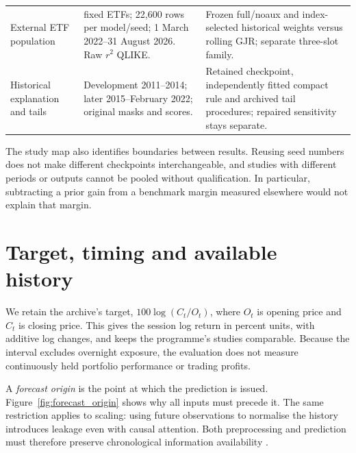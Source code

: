 \begin{longtable}{@{}>{\raggedright\arraybackslash}p{2.7cm}>{\raggedright\arraybackslash}p{5.5cm}>{\raggedright\arraybackslash}p{6.4cm}@{}}
External ETF population & 20 fixed ETFs; 22,600 rows per model/seed; 1 March 2022--31 August 2026. Raw $r^2$ QLIKE. & Frozen full/noaux and index-selected historical weights versus rolling GJR; separate three-slot family. \\
Historical explanation and tails & Development 2011--2014; later 2015--February 2022; original masks and scores. & Retained checkpoint, independently fitted compact rule and archived tail procedures; repaired sensitivity stays separate. \\
\bottomrule\end{longtable}

The study map also identifies boundaries between results. Reusing seed numbers does not make different checkpoints interchangeable, and studies with different periods or outputs cannot be pooled without qualification. In particular, subtracting a prior gain from a benchmark margin measured elsewhere would not explain that margin.

\section{Target, timing and available history}

We retain the archive's target, $100\log(C_t/O_t)$, where $O_t$ is opening price and $C_t$ is closing price. This gives the session log return in percent units, with additive log changes, and keeps the programme's studies comparable. Because the interval excludes overnight exposure, the evaluation does not measure continuously held portfolio performance or trading profits.

A \emph{forecast origin} is the point at which the prediction is issued. Figure~\ref{fig:forecast_origin} shows why all inputs must precede it. The same restriction applies to scaling: using future observations to normalise the history introduces leakage even with causal attention. Both preprocessing and prediction must therefore preserve chronological information availability \citep{tashman2000out,kapoor2023leakage}.

